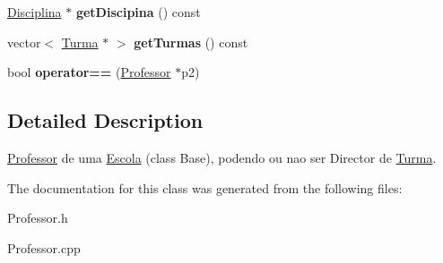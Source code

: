 \begin{DoxyCompactItemize}
\item 
\hypertarget{class_professor_ae09b97fead0e86fa47e9d477a1f4b1d5}{\hyperlink{class_disciplina}{Disciplina} $\ast$ {\bfseries get\-Discipina} () const }\label{class_professor_ae09b97fead0e86fa47e9d477a1f4b1d5}

\item 
\hypertarget{class_professor_a9474309b22807309eacd155312b9f65d}{vector$<$ \hyperlink{class_turma}{Turma} $\ast$ $>$ {\bfseries get\-Turmas} () const }\label{class_professor_a9474309b22807309eacd155312b9f65d}

\item 
\hypertarget{class_professor_afa33df5062ac3fd56de2a54530bd1c68}{bool {\bfseries operator==} (\hyperlink{class_professor}{Professor} $\ast$p2)}\label{class_professor_afa33df5062ac3fd56de2a54530bd1c68}

\end{DoxyCompactItemize}


\subsection{Detailed Description}
\hyperlink{class_professor}{Professor} de uma \hyperlink{class_escola}{Escola} (class Base), podendo ou nao ser Director de \hyperlink{class_turma}{Turma}. 

The documentation for this class was generated from the following files\-:\begin{DoxyCompactItemize}
\item 
Professor.\-h\item 
Professor.\-cpp\end{DoxyCompactItemize}
